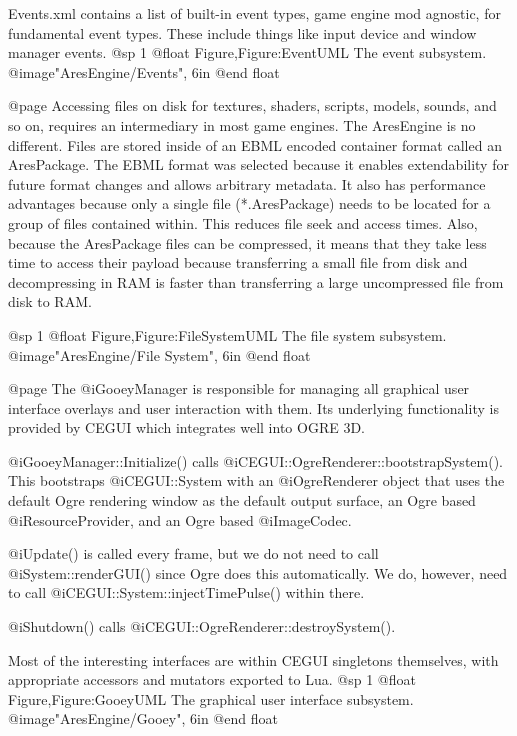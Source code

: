 Events.xml contains a list of built-in event types, game engine mod agnostic, for fundamental event types. These include things like input device and window manager events.
@sp 1
@float Figure,Figure:EventUML
The event subsystem.
@image{"AresEngine/Events", 6in}
@end float

@page 
Accessing files on disk for textures, shaders, scripts, models, sounds, and so on, requires an intermediary in most game engines. The AresEngine is no different. Files are stored inside of an EBML encoded container format called an AresPackage. The EBML format was selected because it enables extendability for future format changes and allows arbitrary metadata. It also has performance advantages because only a single file (*.AresPackage) needs to be located for a group of files contained within. This reduces file seek and access times. Also, because the AresPackage files can be compressed, it means that they take less time to access their payload because transferring a small file from disk and decompressing in RAM is faster than transferring a large uncompressed file from disk to RAM.
            
@sp 1
@float Figure,Figure:FileSystemUML
The file system subsystem.
@image{"AresEngine/File System", 6in}
@end float

@page 
The @i{GooeyManager} is responsible for managing all graphical user interface overlays and user interaction with them. Its underlying functionality is provided by CEGUI which integrates well into OGRE 3D.

@i{GooeyManager::Initialize()} calls @i{CEGUI::OgreRenderer::bootstrapSystem()}. This bootstraps @i{CEGUI::System} with an @i{OgreRenderer} object that uses the default Ogre rendering window as the default output surface, an Ogre based @i{ResourceProvider}, and an Ogre based @i{ImageCodec}.

@i{Update()} is called every frame, but we do not need to call @i{System::renderGUI()} since Ogre does this automatically. We do, however, need to call @i{CEGUI::System::injectTimePulse()} within there.

@i{Shutdown()} calls @i{CEGUI::OgreRenderer::destroySystem()}.

Most of the interesting interfaces are within CEGUI singletons themselves, with appropriate accessors and mutators exported to Lua.
@sp 1
@float Figure,Figure:GooeyUML
The graphical user interface subsystem.
@image{"AresEngine/Gooey", 6in}
@end float

